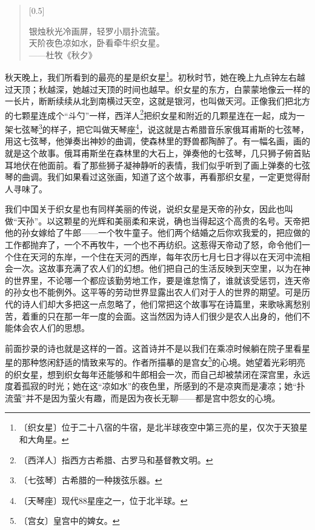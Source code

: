 \documentclass[12pt,UTF-8,openany]{ctexbook}
\begin{document}
\begin{large}
    
    \begin{verse}[0.5\textwidth]
    
    银烛秋光冷画屏，轻罗小扇扑流萤。\\天阶夜色凉如水，卧看牵牛织女星。\\——杜牧《秋夕》
    
    \end{verse}
    
    秋天晚上，我们所看到的最亮的星是织女星\footnote{〔织女星〕位于二十八宿的牛宿，是北半球夜空中第三亮的星，仅次于天狼星和大角星。}。初秋时节，她在晚上九点钟左右越过天顶；秋越深，她越过天顶的时间也越早。织女星的东方，白蒙蒙地像云一样的一长片，断断续续从北到南横过天空，这就是银河，也叫做天河。正像我们把北方的七颗星连成个“斗勺”一样，西洋人\footnote{〔西洋人〕指西方古希腊、古罗马和基督教文明。}把织女星和附近的几颗星连在一起，成为一架七弦琴\footnote{〔七弦琴〕古希腊的一种拨弦乐器。}的样子，把它叫做天琴座\footnote{〔天琴座〕现代88星座之一，位于北半球。}，说这就是古希腊音乐家俄耳甫斯的七弦琴，用这七弦琴，他弹奏出神妙的曲调，使森林里的野兽都陶醉了。有一幅名画，画的就是这个故事。俄耳甫斯坐在森林里的大石上，弹奏他的七弦琴，几只狮子俯首贴耳地伏在他面前。看了那些狮子凝神静听的表情，我们似乎听到了画上弹奏的七弦琴的曲调。我们如果看过这张画，知道了这个故事，再看那织女星，一定更觉得耐人寻味了。
    
    我们中国关于织女星也有同样美丽的传说，说织女星是天帝的孙女，因此也叫做“天孙”。以这颗星的光辉和美丽柔和来说，确也当得起这个高贵的名号。天帝把他的孙女嫁给了牛郎——一个牧牛童子。他们两个结婚之后你欢我爱的，把应做的工作都抛弃了，一个不再牧牛，一个也不再纺织。这惹得天帝动了怒，命令他们一个住在天河的东岸，一个住在天河的西岸，每年农历七月七日才得以在天河中流相会一次。这故事充满了农人们的幻想。他们把自己的生活反映到天空里，以为在神的世界里，不论哪一个都应该勤劳地工作，要是谁怠惰了，谁就该受惩罚，连天帝的孙女也不能例外。这平等的劳动世界显露出农人们对于人的世界的期望。可是历代的诗人们却大多把这一点忽略了，他们常把这个故事写在诗篇里，来歌咏离愁别苦，着重的只在那一年一度的会面。这当然因为诗人们很少是农人出身的，他们不能体会农人们的思想。
    
    前面抄录的诗也就是这样的一首。这首诗并不是以我们在乘凉时候躺在院子里看星星的那种悠闲舒适的情致来写的。作者所描摹的是宫女\footnote{〔宫女〕皇宫中的婢女。}的心境。她望着光彩明亮的织女星，想到织女每年还能够和牛郎相会一次，而自己却被禁闭在深宫里，永远度着孤寂的时光；她在这“凉如水”的夜色里，所感到的不是凉爽而是凄凉；她“扑流萤”并不是因为萤火有趣，而是因为夜长无聊——都是宫中怨女的心境。
    

\end{large}
\end{document}
